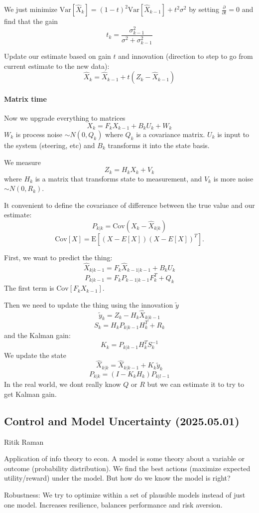 \documentclass[12pt]{article}
\theoremstyle{remark}
\begin{document}
We just minimize $\mathrm{Var}[\hat X_k] = (1-t)^2 \mathrm{Var}[\hat X_{k-1}]+t^2 \sigma^2$ by setting $\frac{\partial}{\partial t}= 0$ and find that the gain \[t_k=\frac{\sigma_{k-1}^2}{\sigma^2+\sigma_{k-1}^2}\]

Update our estimate based on gain $t$ and innovation (direction to step to go from current estimate to the new data):
\[
\hat X_k = \hat X_{k-1} + t(Z_k - \hat X_{k-1})
\]

\paragraph{Matrix time} Now we upgrade everything to matrices
\[
X_k = F_k X_{k-1}+B_k U_k + W_k
\]
$W_k$ is process noise $\sim N(0,Q_k)$ where $Q_k$ is a covariance matrix. 
$U_k$ is input to the system (steering, etc) and $B_k$ transforms it into the state basis.

We measure
\[Z_k = H_k X_k+V_k\]
where $H_k$ is a matrix that transforms state to measurement, and $V_k$ is more noise $\sim N(0,R_k)$.

It convenient to define the covariance of difference between the true value and our estimate:
\[
P_{k|k} = \mathrm{Cov}(X_k - \hat X_{k|k})
\]
\[
\text{Cov}[X]=\text{E}[(X-E[X])(X-E[X])^T].
\]

First, we want to predict the thing:
\[
\hat X_{k|k-1} = F_k \hat X_{k-1|k-1}+B_k U_k
\]
\[
P_{k|k-1} = F_k P_{k-1|k-1}F_k^T+Q_k
\]
The first term is $\mathrm{Cov}[F_k X_{k-1}]$.

Then we need to update the thing using the innovation $\tilde y$
\[\tilde y_k = Z_k - H_k \hat X_{k|k-1}\]
\[S_k = H_k P_{k|k-1} H_k^T+R_k\]
and the Kalman gain:
\[K_k = P_{k|k-1} H_k^TS_k^{-1}\]
We update the state
\[\hat X_{k|k} = \hat X_{k|k-1} + K_k \tilde y_k\]
\[P_{k|k}=(I-K_k H_k)P_{k|l-1}\]
In the real world, we dont really know $Q$ or $R$ but we can estimate it to try to get Kalman gain.

\subsection{Control and Model Uncertainty (2025.05.01)}
Ritik Raman

Application of info theory to econ. A model is some theory about a variable or outcome (probability distribution). We find the best actions (maximize expected utility/reward) under the model. But how do we know the model is right?

Robustness: We try to optimize within a set of plausible models instead of just one model. Increases resilience, balances performance and risk aversion. 
\end{document}
